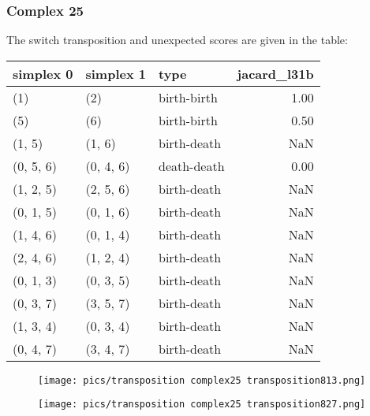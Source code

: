 \documentclass{article}
\begin{document}
    \subsubsection{Complex 25}
    \par The switch transposition and unexpected scores are given in the table:
    \begin{center}
\begin{tabular}{lllr}
\toprule
simplex 0 & simplex 1 & type & jacard\_l31b \\
\midrule
(1) & (2) & birth-birth & 1.00 \\
(5) & (6) & birth-birth & 0.50 \\
(1, 5) & (1, 6) & birth-death & NaN \\
(0, 5, 6) & (0, 4, 6) & death-death & 0.00 \\
(1, 2, 5) & (2, 5, 6) & birth-death & NaN \\
(0, 1, 5) & (0, 1, 6) & birth-death & NaN \\
(1, 4, 6) & (0, 1, 4) & birth-death & NaN \\
(2, 4, 6) & (1, 2, 4) & birth-death & NaN \\
(0, 1, 3) & (0, 3, 5) & birth-death & NaN \\
(0, 3, 7) & (3, 5, 7) & birth-death & NaN \\
(1, 3, 4) & (0, 3, 4) & birth-death & NaN \\
(0, 4, 7) & (3, 4, 7) & birth-death & NaN \\
\bottomrule
\end{tabular}
\end{center}
    
        \begin{figure}[ht]
        \centering
        \texttt{[image: pics/transposition complex25 transposition813.png]}
        \end{figure}
    

        \begin{figure}[ht]
        \centering
        \texttt{[image: pics/transposition complex25 transposition827.png]}
        \end{figure}
    
    
\end{document}
